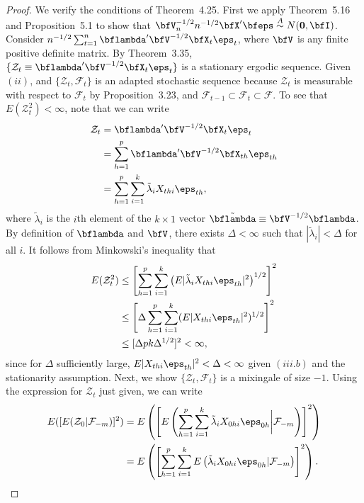 \begin{proof}
We verify the conditions of Theorem~4.25. First we apply Theorem~5.16 and Proposition~5.1 to show that $\bfV_n^{-1/2}n^{-1/2}\bfX'\bfeps \overset{A}{\sim} N(\mathbf{0}, \bfI)$. Consider $n^{-1/2}\sum_{t=1}^{n}\bflambda'\bfV^{-1/2}\bfX_t\eps_t$, where $\bfV$ is any finite positive definite matrix. By Theorem~3.35, $\{\mathcal{Z}_t \equiv \bflambda'\bfV^{-1/2}\bfX_t\eps_t\}$ is a stationary ergodic sequence. Given $(ii)$, and $\{\mathcal{Z}_t, \mathcal{F}_t\}$ is an adapted stochastic sequence because $\mathcal{Z}_t$ is measurable with respect to $\mathcal{F}_t$ by Proposition~3.23, and $\mathcal{F}_{t-1} \subset \mathcal{F}_t \subset \mathcal{F}$. To see that $E(\mathcal{Z}_t^2) < \infty$, note that we can write
\begin{align*}
\mathcal{Z}_t &= \bflambda'\bfV^{-1/2}\bfX_t\eps_t \\
&= \sum_{h=1}^{p} \bflambda'\bfV^{-1/2}\bfX_{th}\eps_{th} \\
&= \sum_{h=1}^{p}\sum_{i=1}^{k}\tilde{\lambda}_i X_{thi}\eps_{th},
\end{align*}
where $\tilde{\lambda}_i$ is the $i$th element of the $k \times 1$ vector $\tilde{\bflambda} \equiv \bfV^{-1/2}\bflambda$. By definition of $\bflambda$ and $\bfV$, there exists $\Delta < \infty$ such that $|\tilde{\lambda}_i| < \Delta$ for all $i$. It follows from Minkowski's inequality that
\begin{align*}
E(\mathcal{Z}_t^2) &\leq \left[\sum_{h=1}^{p}\sum_{i=1}^{k}\left(E|\tilde{\lambda}_i X_{thi}\eps_{th}|^2\right)^{1/2}\right]^2 \\
&\leq \left[\Delta\sum_{h=1}^{p}\sum_{i=1}^{k}(E|X_{thi}\eps_{th}|^2)^{1/2}\right]^2 \\
&\leq [\Delta pk\Delta^{1/2}]^2 < \infty,
\end{align*}
since for $\Delta$ sufficiently large, $E|X_{thi}\eps_{th}|^2 < \Delta < \infty$ given $(iii.b)$ and the stationarity assumption. Next, we show $\{\mathcal{Z}_t, \mathcal{F}_t\}$ is a mixingale of size $-1$. Using the expression for $\mathcal{Z}_t$ just given, we can write
\begin{align*}
E([E(\mathcal{Z}_0|\mathcal{F}_{-m})]^2) &= E\left(\left[E\left(\sum_{h=1}^{p}\sum_{i=1}^{k}\tilde{\lambda}_i X_{0hi}\eps_{0h}\bigg|\mathcal{F}_{-m}\right)\right]^2\right) \\
&= E\left(\left[\sum_{h=1}^{p}\sum_{i=1}^{k}E\left(\tilde{\lambda}_i X_{0hi}\eps_{0h}|\mathcal{F}_{-m}\right)\right]^2\right).
\end{align*}

\end{proof}
